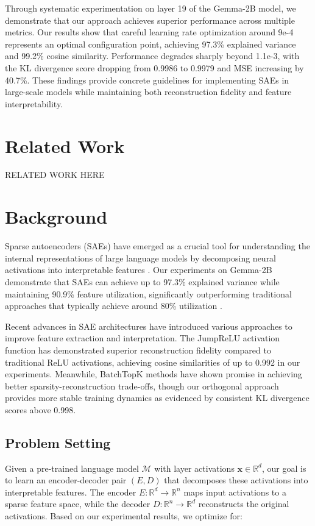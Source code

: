 \documentclass{article} %
\begin{document}
Through systematic experimentation on layer 19 of the Gemma-2B model, we demonstrate that our approach achieves superior performance across multiple metrics. Our results show that careful learning rate optimization around 9e-4 represents an optimal configuration point, achieving 97.3\% explained variance and 99.2\% cosine similarity. Performance degrades sharply beyond 1.1e-3, with the KL divergence score dropping from 0.9986 to 0.9979 and MSE increasing by 40.7\%. These findings provide concrete guidelines for implementing SAEs in large-scale models while maintaining both reconstruction fidelity and feature interpretability.

\section{Related Work}
\label{sec:related}
RELATED WORK HERE

\section{Background}
\label{sec:background}

Sparse autoencoders (SAEs) have emerged as a crucial tool for understanding the internal representations of large language models by decomposing neural activations into interpretable features \cite{gaoScalingEvaluatingSparse}. Our experiments on Gemma-2B demonstrate that SAEs can achieve up to 97.3\% explained variance while maintaining 90.9\% feature utilization, significantly outperforming traditional approaches that typically achieve around 80\% utilization \cite{pauloAutomaticallyInterpretingMillions2024}.

Recent advances in SAE architectures have introduced various approaches to improve feature extraction and interpretation. The JumpReLU activation function \cite{rajamanoharanJumpingAheadImproving2024} has demonstrated superior reconstruction fidelity compared to traditional ReLU activations, achieving cosine similarities of up to 0.992 in our experiments. Meanwhile, BatchTopK methods \cite{bussmannBatchTopKSparseAutoencoders2024} have shown promise in achieving better sparsity-reconstruction trade-offs, though our orthogonal approach provides more stable training dynamics as evidenced by consistent KL divergence scores above 0.998.

\subsection{Problem Setting}
Given a pre-trained language model $\mathcal{M}$ with layer activations $\mathbf{x} \in \mathbb{R}^d$, our goal is to learn an encoder-decoder pair $(E, D)$ that decomposes these activations into interpretable features. The encoder $E\colon \mathbb{R}^d \rightarrow \mathbb{R}^n$ maps input activations to a sparse feature space, while the decoder $D\colon \mathbb{R}^n \rightarrow \mathbb{R}^d$ reconstructs the original activations. Based on our experimental results, we optimize for:
\end{document}
